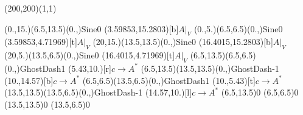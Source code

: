 \unitlength=1bp%

\begin{feynartspicture}(200,200)(1,1)

\FADiagram{}
\FAProp(0.,15.)(6.5,13.5)(0.,){Sine}{0}
\FALabel(3.59853,15.2803)[b]{$A|_V$}
\FAProp(0.,5.)(6.5,6.5)(0.,){Sine}{0}
\FALabel(3.59853,4.71969)[t]{$A|_V$}
\FAProp(20,15.)(13.5,13.5)(0.,){Sine}{0}
\FALabel(16.4015,15.2803)[b]{$A|_V$}
\FAProp(20,5.)(13.5,6.5)(0.,){Sine}{0}
\FALabel(16.4015,4.71969)[t]{$A|_V$}
\FAProp(6.5,13.5)(6.5,6.5)(0.,){GhostDash}{1}
\FALabel(5.43,10.)[r]{$c\to A^*$}
\FAProp(6.5,13.5)(13.5,13.5)(0.,){GhostDash}{-1}
\FALabel(10.,14.57)[b]{$c\to A^*$}
\FAProp(6.5,6.5)(13.5,6.5)(0.,){GhostDash}{1}
\FALabel(10.,5.43)[t]{$c\to A^*$}
\FAProp(13.5,13.5)(13.5,6.5)(0.,){GhostDash}{-1}
\FALabel(14.57,10.)[l]{$c\to A^*$}
\FAVert(6.5,13.5){0}
\FAVert(6.5,6.5){0}
\FAVert(13.5,13.5){0}
\FAVert(13.5,6.5){0}
\end{feynartspicture}

